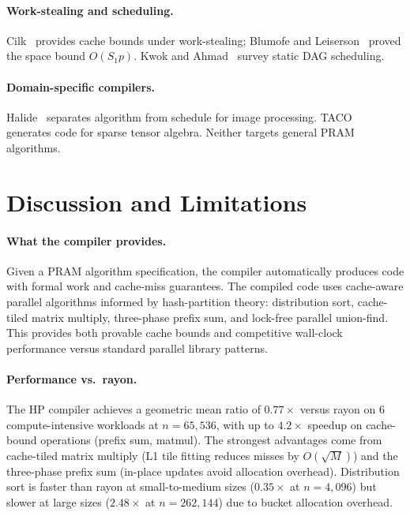 \documentclass[11pt]{article}
\begin{document}
\paragraph{Work-stealing and scheduling.}
Cilk~\cite{frigo1998implementation} provides cache bounds under
work-stealing; Blumofe and Leiserson~\cite{blumofe1999scheduling}
proved the space bound $O(S_1 p)$.  Kwok and
Ahmad~\cite{kwok1999static} survey static DAG scheduling.

\paragraph{Domain-specific compilers.}
Halide~\cite{ragan2013halide} separates algorithm from schedule for
image processing.  TACO~\cite{kjolstad2017tensor} generates code for
sparse tensor algebra.  Neither targets general PRAM algorithms.

\section{Discussion and Limitations}
\label{sec:discussion}

\paragraph{What the compiler provides.}
Given a PRAM algorithm specification, the compiler automatically produces
code with formal work and cache-miss guarantees.  The compiled code uses
cache-aware parallel algorithms informed by hash-partition theory:
distribution sort, cache-tiled matrix multiply, three-phase prefix sum,
and lock-free parallel union-find.  This provides both provable cache
bounds and competitive wall-clock performance versus standard parallel
library patterns.

\paragraph{Performance vs.\ rayon.}
The HP compiler achieves a geometric mean ratio of $0.77\times$ versus
rayon on 6 compute-intensive workloads at $n = 65{,}536$, with up to
$4.2\times$ speedup on cache-bound operations (prefix sum, matmul).
The strongest advantages come from cache-tiled matrix multiply (L1
tile fitting reduces misses by $O(\sqrt{M})$) and the three-phase
prefix sum (in-place updates avoid allocation overhead).  Distribution
sort is faster than rayon at small-to-medium sizes ($0.35\times$ at
$n = 4{,}096$) but slower at large sizes ($2.48\times$ at
$n = 262{,}144$) due to bucket allocation overhead.
\end{document}
